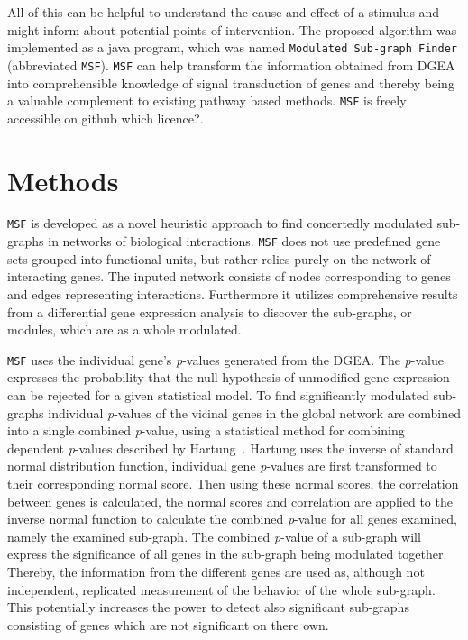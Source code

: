 \documentclass[10pt,a4paper,twocolumn]{article}
\newcommand{\TODO}[1]{\begingroup\color{red}#1\endgroup}
\begin{document}
All of this can be helpful to understand the cause and effect of a stimulus
and might inform about potential points of intervention. The proposed
algorithm was implemented as a java program, which was named
\texttt{Modulated Sub-graph Finder} (abbreviated
\texttt{MSF}). \texttt{MSF} can help transform the information obtained
from DGEA into comprehensible knowledge of signal transduction of genes and
thereby being a valuable complement to existing pathway based
methods. \texttt{MSF} is freely accessible on github \TODO{which licence?}.

\section*{Methods}
\texttt{MSF} is developed as a novel heuristic approach to
find concertedly modulated sub-graphs in networks of biological interactions.
\texttt{MSF} does not use predefined gene sets grouped into
functional units, but rather relies purely on the network of interacting genes.
The inputed network consists of nodes corresponding to genes and edges
representing interactions. Furthermore it utilizes comprehensive results from a
differential gene expression analysis to discover the sub-graphs, or modules, which
are as a whole modulated.

\texttt{MSF} uses the individual gene's \textit{p}-values generated
from the DGEA. The \textit{p}-value expresses the probability that the
null hypothesis of unmodified gene expression can be rejected for a
given statistical model. To find significantly modulated sub-graphs
individual \textit{p}-values of the vicinal genes in the global
network are combined into a single combined \textit{p}-value, using a
statistical method for combining dependent \textit{p}-values described
by Hartung~\cite{Hartung}. Hartung uses the inverse of standard normal
distribution function, individual gene \textit{p}-values are first
transformed to their corresponding normal score. Then using these
normal scores, the correlation between genes is calculated, the normal
scores and correlation are applied to the inverse normal function to
calculate the combined \textit{p}-value for all genes examined, namely the
examined sub-graph. The combined \textit{p}-value of a sub-graph will
express the significance of all genes in the sub-graph being modulated
together. Thereby, the information from the different genes are used as,
although not independent, replicated measurement of the behavior of the whole
sub-graph. This potentially increases the power to detect also significant
sub-graphs consisting of genes which are not significant on there own.
\newline
\end{document}
